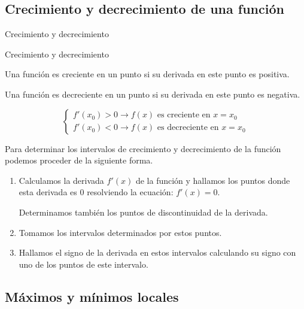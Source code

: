 \documentclass[8pt]{beamer}
\begin{document}
\subsection{Crecimiento y decrecimiento de una función}

\begin{frame}[t]{Crecimiento y decrecimiento}
\begin{alertblock}{Crecimiento y decrecimiento}

Una función es creciente en un punto si su derivada en este punto es positiva.

Una función es decreciente en un punto si su derivada en este punto es negativa.

\[ \begin{cases} f'(x_0)> 0 \rightarrow f(x) \text{ es creciente en } x=x_0 \\ f'(x_0)< 0 \rightarrow f(x) \text{ es decreciente en } x=x_0 \end{cases} \]
\end{alertblock}

\pause
Para determinar los intervalos de crecimiento y decrecimiento de la función podemos proceder de la siguiente forma.

\pause
\begin{enumerate}[<+-| alert@+>]
\item Calculamos la derivada $f'(x)$ de la función y hallamos los puntos donde esta derivada es $0$ resolviendo la ecuación: $f'(x)=0$. 

Determinamos también los puntos de discontinuidad de la derivada.
\item Tomamos los intervalos determinados por estos puntos.
\item Hallamos el signo de la derivada en estos intervalos calculando su signo con uno de los puntos de este intervalo.
\end{enumerate}
\end{frame}

\subsection{Máximos y mínimos locales}
\end{document}
